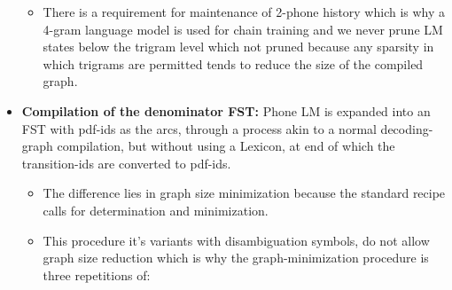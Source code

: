 \begin{itemize}
\begin{itemize}
        \item There is a requirement for maintenance of 2-phone history which is why a 4-gram language model is used for chain training and we never prune LM states below the trigram level which not pruned because any sparsity in which trigrams are permitted tends to reduce the size of the compiled graph. %
    \end{itemize}
    \item \textbf{Compilation of the denominator FST:} Phone LM is expanded into an FST with pdf-ids as the arcs, through a process akin to a normal decoding-graph compilation, but without using a Lexicon, at end of which the transition-ids are converted to pdf-ids. 
    \begin{itemize}
        \item The difference lies in graph size minimization because the standard recipe calls for determination and minimization. 
        \item This procedure it's variants with disambiguation symbols, do not allow graph size reduction which is why the graph-minimization procedure is three repetitions of: 
        \begin{enumerate}

\end{enumerate}
\end{itemize}
\end{itemize}
